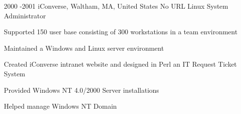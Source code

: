 \documentclass[10pt]{article} %
\begin{document}

\job
{2000 -}{2001}
{iConverse, Waltham, MA, United States}
{No URL}
{Linux System Administrator}
{\begin{itemize-noindent}
\item{Supported 150 user base consisting of 300 workstations in a team environment}
\item{Maintained a Windows and Linux server environment}
\item{Created iConverse intranet website and designed in Perl an IT Request Ticket System}
\item{Provided Windows NT 4.0/2000 Server installations}
\item{Helped manage Windows NT Domain}
\end{itemize-noindent}}

\end{document}
